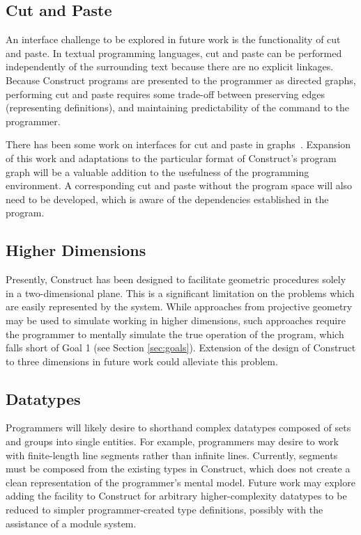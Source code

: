 \documentclass[twoside,openright,11pt]{report}
\begin{document}
\subsection{Cut and Paste}

An interface challenge to be explored in future work is the functionality of cut and paste. 
In textual programming languages, cut and paste can be performed independently of the surrounding text because there are no explicit linkages.
Because Construct programs are presented to the programmer as directed graphs, performing cut and paste requires some trade-off between preserving edges (representing definitions), and maintaining predictability of the command to the programmer.

There has been some work on interfaces for cut and paste in graphs~\cite{ibrahim1998graphpaste}.
Expansion of this work and adaptations to the particular format of Construct's program graph will be a valuable addition to the usefulness of the programming environment.
A corresponding cut and paste without the program space will also need to be developed, which is aware of the dependencies established in the program.

\subsection{Higher Dimensions}

Presently, Construct has been designed to facilitate geometric procedures solely in a two-dimensional plane. 
This is a significant limitation on the problems which are easily represented by the system. 
While approaches from projective geometry may be used to simulate working in higher dimensions, such approaches require the programmer to mentally simulate the true operation of the program, which falls short of Goal 1 (see Section \ref{sec:goals}).
Extension of the design of Construct to three dimensions in future work could alleviate this problem.

\subsection{Datatypes}

Programmers will likely desire to shorthand complex datatypes composed of sets and groups into single entities. 
For example, programmers may desire to work with finite-length line segments rather than infinite lines.
Currently, segments must be composed from the existing types in Construct, which does not create a clean representation of the programmer's mental model.
Future work may explore adding the facility to Construct for arbitrary higher-complexity datatypes to be reduced to simpler programmer-created type definitions, possibly with the assistance of a module system.
\end{document}
